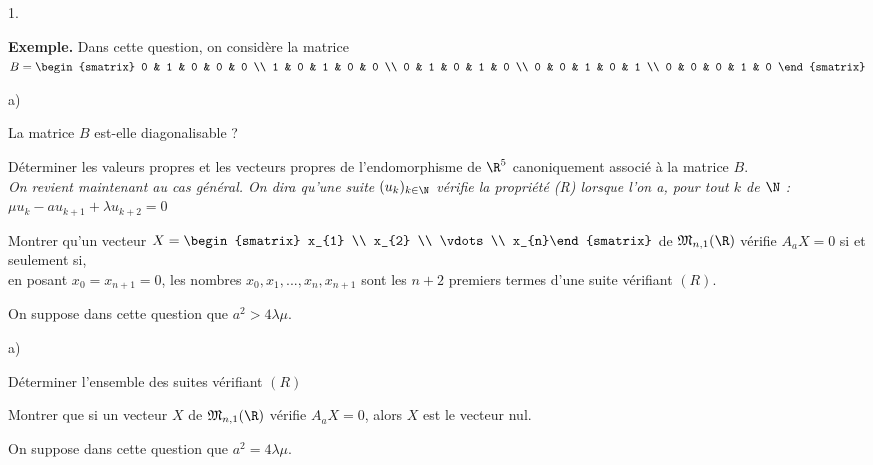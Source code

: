 \documentclass[11pt]{article}%
\begin{document}
\begin{noliste}{1.}
 \setlength{\itemsep}{4mm}
\item \textbf{Exemple.} Dans cette question, on considère la matrice $B
= 
\begin{smatrix}
0 & 1 & 0 & 0 & 0 \\
1 & 0 & 1 & 0 & 0 \\
0 & 1 & 0 & 1 & 0 \\
0 & 0 & 1 & 0 & 1 \\
0 & 0 & 0 & 1 & 0
\end{smatrix}
$

\begin{noliste}{a)}
 \setlength{\itemsep}{2mm}
\item La matrice $B$ est-elle diagonalisable ?

\item Déterminer les valeurs propres et les vecteurs propres de
l'endomorphisme de $\R^{5}$ canoniquement associé à la matrice $B.$\\
\textsl{On revient maintenant au cas général. On dira qu'une suite
$(u_{k})_{k\in \N}$ vérifie la propriété (R) lorsque l'on a, pour
tout $k$ de $\N$ : $\mu u_{k}-au_{k + 1} + \lambda u_{k + 2} = 0$}
\end{noliste}

\item Montrer qu'un vecteur $X = 
\begin{smatrix}
x_{1} \\
x_{2} \\
\vdots \\
x_{n}\end{smatrix}
$ de $\mathfrak{M}_{n,1}(\R)$ vérifie $A_{a}X = 0$ si et seulement
si,\\
en posant $x_{0} = x_{n + 1} = 0$, les nombres
$x_{0},x_{1},...,x_{n},x_{n + 1}$
sont les $n + 2$ premiers termes d'une suite vérifiant $(R)$.

\item On suppose dans cette question que $a^{2}> 4 \lambda \mu$.

\begin{noliste}{a)}
 \setlength{\itemsep}{2mm}
\item Déterminer l'ensemble des suites vérifiant $(R)$

\item Montrer que si un vecteur $X$ de $\mathfrak{M}_{n,1}(\R)$ vérifie
$A_{a}X = 0$, alors $X$ est le vecteur nul.
\end{noliste}

\item On suppose dans cette question que $a^{2} = 4 \lambda \mu$.


\end{noliste}
\end{document}
